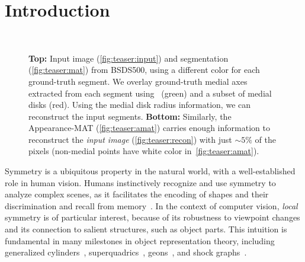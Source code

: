 \documentclass[10pt,twocolumn,letterpaper]{article}
\begin{document}
\section{Introduction}\label{sec:introduction}
\begin{figure}[!t]
\centering
{}
 \\
\caption{\textbf{Top:} Input image (\ref{fig:teaser:input}) and segmentation (\ref{fig:teaser:mat}) from BSDS500,
using a different color for each ground-truth segment. 
We overlay ground-truth medial axes extracted from each segment using~\cite{telea2002augmented} (green) and a subset of medial disks (red). 
Using the medial disk radius information, we can reconstruct the input segments. 
\textbf{Bottom:} Similarly, the Appearance-MAT (\ref{fig:teaser:amat}) carries enough information to reconstruct the 
 \emph{input image} (\ref{fig:teaser:recon}) with just $\sim 5\%$ of the pixels 
 (non-medial points have white color in~\ref{fig:teaser:amat}).}
\label{fig:teaser}
\end{figure}


Symmetry is a ubiquitous property in the natural world, with a well-established role in human vision.
Humans instinctively recognize and use symmetry to analyze complex scenes, as it facilitates the encoding of shapes and
their discrimination and recall from memory~\cite{barlow1979versatility,royer1981detection,wagemans1998parallel}.
In the context of computer vision, \emph{local} symmetry is of particular interest, 
because of its robustness to viewpoint changes and its connection to salient structures, such as object parts.
This intuition is fundamental in many milestones in object representation theory, including generalized
cylinders~\cite{binford1971visual}, superquadrics~\cite{barr1981superquadrics}, 
geons~\cite{biederman1987recognition}, and shock graphs~\cite{siddiqi1999shock}.
\end{document}
